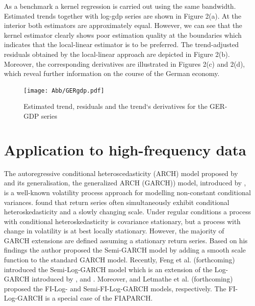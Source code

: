 \documentclass[12pt]{article}
\begin{document}
As a benchmark a kernel regression is carried out using the same bandwidth. Estimated trends together with log-gdp series are shown in Figure 2(a). At the interior both estimators are approximately equal. However, we can see that the kernel estimator clearly shows poor estimation quality at the boundaries which indicates that the local-linear estimator is to be preferred. The trend-adjusted residuals obtained by the local-linear approach are depicted in Figure 2(b). Moreover, the corresponding derivatives are illustrated in Figures 2(c) and 2(d), which reveal further information on the course of the German economy.
 
\begin{figure}[h!]
	\texttt{[image: Abb/GERgdp.pdf]}
	\caption{Estimated trend, residuals and the trend`s derivatives for the GER-GDP series}
\end{figure}


\section{Application to high-frequency data}
The autoregressive conditional heteroscedasticity (ARCH) model proposed by \citet{engle1982autoregressive} and its generalisation, the generalized ARCH (GARCH)) model, introduced by \citet{bollerslev1986generalized} , is a well-known volatility process approach for modelling non-constant conditional variances. \citet{feng2004simultaneously} found that return series often simultaneously exhibit conditional heteroskedasticity and a slowly changing scale. Under regular conditions a process with conditional heteroskedasticity is covariance stationary, but a process with change in volatility is at best locally stationary. However, the majority of GARCH extensions are defined assuming a stationary return series. Based on his findings the author proposed the Semi-GARCH model by adding a smooth scale function to the standard GARCH model. Recently, Feng et al. (forthcoming) introduced the Semi-Log-GARCH model which is an extension of the Log-GARCH introduced by \citet{pantula1986modeling}, \citet{geweke1986comment} and \citet{milhoj1987conditional}. Moreover, \citet{feng2020fractionally} and Letmathe et al. (forthcoming) proposed the FI-Log- and Semi-FI-Log-GARCH models, respectively. The FI-Log-GARCH is a special case of the FIAPARCH.
\end{document}
